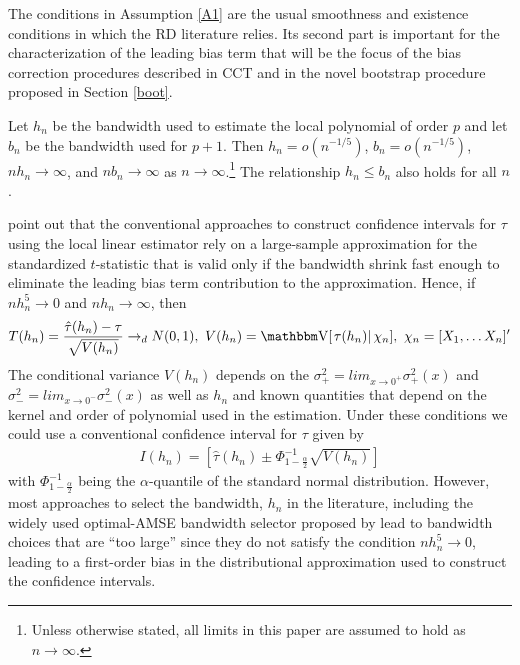 \documentclass[12pt,fleqn]{article}
\begin{document}
The conditions in Assumption \ref{A1} are the usual smoothness and existence conditions in which the RD literature relies. Its second part is important for the characterization of the leading bias term that will be the focus of the bias correction procedures described in CCT and in the novel  bootstrap procedure proposed in Section \ref{boot}.

\begin{assumption}[Bandwidth]\label{A3}
  Let $h_n$ be the bandwidth used to estimate the local polynomial of
  order $p$ and let $b_n$ be the bandwidth used for $p+1$. Then
  $h_n = o(n^{-1/5})$, $b_n = o(n^{-1/5})$, $n h_n \to \infty$, and
  $n b_n \to \infty$ as $n \to \infty$.\footnote{%
    Unless otherwise stated, all limits in this paper are assumed to
    hold as $n \to \infty$.} %
  The relationship $h_n \leq b_n$ also holds for all $n$.
\end{assumption}

\cite{calonico2014} point out that the conventional approaches to construct confidence intervals for $\tau$ using the local linear estimator rely on a large-sample approximation for the standardized $t$-statistic that is valid only if the bandwidth shrink fast enough to eliminate the leading bias term contribution to the approximation. Hence, if $nh_{n}^{5}\rightarrow0$ and $nh_{n}\rightarrow \infty$, then
 \begin{align}
  T(h_{n})=\frac{\hat{\tau}(h_{n})-\tau}{\sqrt{V(h_{n})}}\rightarrow_{d}N(0,1), \text{        }V(h_{n})=\V[\left.\tau(h_{n})\right|\chi_{n}], \text{        }\chi_{n}=[X_{1}, \dots X_{n}]^{\prime}
 \end{align}
 The conditional variance $V(h_{n})$ depends on the $\sigma^{2}_{+}=lim_{x \rightarrow 0^{+}}\sigma^{2}_{+}(x)$ and $\sigma^{2}_{-}=lim_{x \rightarrow 0^{-}}\sigma^{2}_{-}(x)$ as well as $h_{n}$ and known quantities that depend on the kernel and order of polynomial used in the estimation. Under these conditions we could use a conventional confidence interval for $\tau$ given by
 \begin{align}
  I(h_{n})=\left[\hat{\tau}(h_{n})\pm \Phi^{-1}_{1-\frac{\alpha}{2}}\sqrt{V(h_{n})} \right]
 \end{align}
with $\Phi^{-1}_{1-\frac{\alpha}{2}}$ being the $\alpha$-quantile of the standard normal distribution. However, most approaches to select the bandwidth, $h_{n}$ in the literature, including the widely used optimal-AMSE bandwidth selector proposed by \cite{IK} lead to bandwidth choices that are ``too large'' since they do not satisfy the condition $nh_{n}^{5}\rightarrow0$, leading to a first-order bias in the distributional approximation used to construct the confidence intervals.
\end{document}
